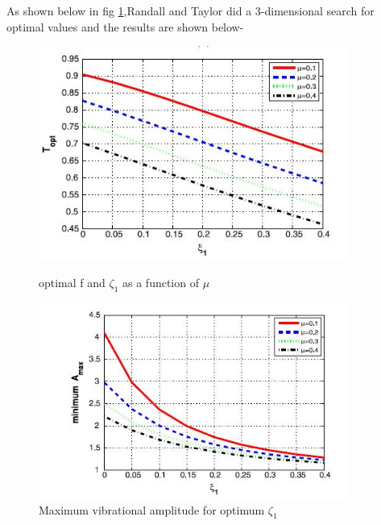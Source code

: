 \begin{enumerate}[i)]
\begin{itemize}
\end{itemize}
As shown below in fig \ref{11},Randall and Taylor did a 3-dimensional search for optimal values and the results are shown below-
\begin{figure}[h!]
    \centering
    \begin{minipage}{0.45\textwidth}
        \centering
        \includegraphics[width=0.9\textwidth]{"figures/11"}
        \caption{optimal f and $\zeta_1$ as a function of $\mu $}
        \label{11}
    \end{minipage}\hfill
    \begin{minipage}{0.45\textwidth}
        \centering
        \includegraphics[width=0.9\textwidth]{"figures/12"}
        \caption{Maximum vibrational amplitude for optimum $\zeta_1$ }
    \end{minipage}
    

\end{figure}
\end{enumerate}
